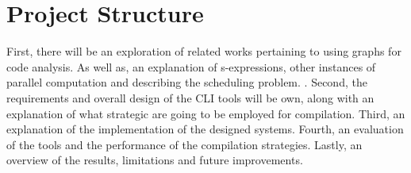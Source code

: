 \section{Project Structure}

First, there will be an exploration of related works pertaining to using graphs
for code analysis. As well as, an explanation of s-expressions, other instances
of parallel computation and describing the scheduling problem. . Second, the requirements
and overall design of the CLI tools will be own, along with an explanation of
what strategic are going to be employed for compilation. Third, an explanation
of the implementation of the designed systems. Fourth, an evaluation of the
tools and the performance of the compilation strategies. Lastly, an overview of
the results, limitations and future improvements.
